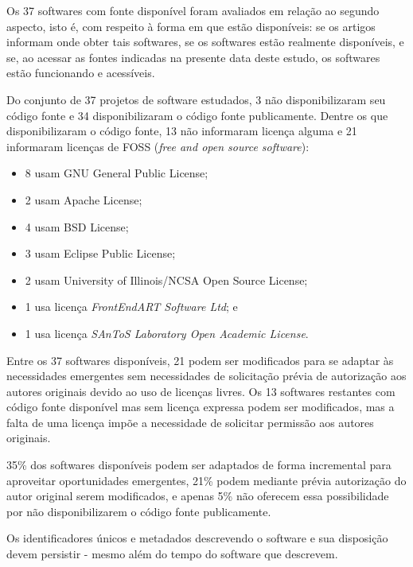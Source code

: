 Os 37 softwares com fonte disponível foram avaliados em relação ao segundo
aspecto, isto é, com respeito à forma em que estão disponíveis:
se os artigos informam onde obter tais softwares, se os softwares estão realmente disponíveis, e 
se, ao acessar as fontes indicadas na presente data deste estudo, os softwares estão funcionando e
acessíveis.

Do conjunto de 37 projetos de software estudados, %
3 não disponibilizaram seu código fonte e  %
34 disponibilizaram o código fonte publicamente.
Dentre os que disponibilizaram o código fonte, 13 não informaram licença alguma
e 21 informaram licenças de FOSS ({\it free and open source software}):

\begin{itemize}
  \item 8 usam GNU General Public License;
  \item 2 usam Apache License;
  \item 4 usam BSD License;
  \item 3 usam Eclipse Public License;
  \item 2 usam University of Illinois/NCSA Open Source License;
  \item 1 usa licença {\it FrontEndART Software Ltd}; e
  \item 1 usa licença {\it SAnToS Laboratory Open Academic License}.
\end{itemize}

Entre os 37 softwares disponíveis, 21 podem ser modificados para se adaptar às
necessidades emergentes sem necessidades de solicitação prévia de autorização
aos autores originais devido ao uso de licenças livres. 
Os 13 softwares restantes com código fonte disponível mas sem licença expressa podem
ser modificados, mas a falta de uma licença impõe a necessidade
de solicitar permissão aos autores originais.

35\% dos softwares disponíveis podem ser adaptados de forma incremental para
aproveitar oportunidades emergentes, 21\% podem mediante prévia autorização do
autor original serem modificados, e apenas 5\% não oferecem essa possibilidade
por não disponibilizarem o código fonte publicamente.


Os identificadores únicos e metadados descrevendo o software e sua disposição
devem persistir - mesmo além do tempo do software que descrevem.

